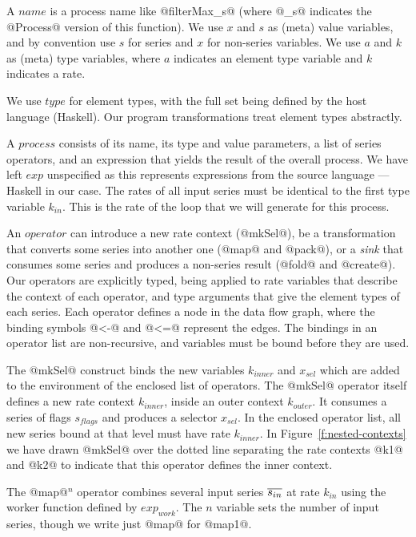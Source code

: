 A $name$ is a process name like @filterMax_s@ (where @_s@ indicates the @Process@ version of this function). We use $x$ and $s$ as (meta) value variables, and by convention use $s$ for series and $x$ for non-series variables. We use $a$ and $k$ as (meta) type variables, where $a$ indicates an element type variable and $k$ indicates a rate.

We use $type$ for element types, with the full set being defined by the host language (Haskell). Our program transformations treat element types abstractly.

A $process$ consists of its name, its type and value parameters, a list of series operators, and an expression that yields the result of the overall process. We have left $exp$ unspecified as this represents expressions from the source language --- Haskell in our case. The rates of all input series must be identical to the first type variable $k_{in}$. This is the rate of the loop that we will generate for this process.

An $operator$ can introduce a new rate context (@mkSel@), be a transformation that converts some series into another one (@map@ and @pack@), or a \emph{sink} that consumes some series and produces a non-series result (@fold@ and @create@). Our operators are explicitly typed, being applied to rate variables that describe the context of each operator, and type arguments that give the element types of each series. Each operator defines a node in the data flow graph, where the binding symbols @<-@ and @<=@ represent the edges. The bindings in an operator list are non-recursive, and variables must be bound before they are used.

The @mkSel@ construct binds the new variables $k_{inner}$ and $x_{sel}$ which are added to the environment of the enclosed list of operators. The @mkSel@ operator itself defines a new rate context $k_{inner}$, inside an outer context $k_{outer}$. It consumes a series of flags $s_{flags}$ and produces a selector $x_{sel}$. In the enclosed operator list, all new series bound at that level must have rate $k_{inner}$. In Figure~\ref{f:nested-contexts} we have drawn @mkSel@ over the dotted line separating the rate contexts @k1@ and @k2@ to indicate that this operator defines the inner context.

The @map@$^{n}$ operator combines several input series $\overline{s_{in}}$ at rate $k_{in}$ using the worker function defined by $exp_{work}$.  The $n$ variable sets the number of input series, though we write just @map@ for @map1@. 


